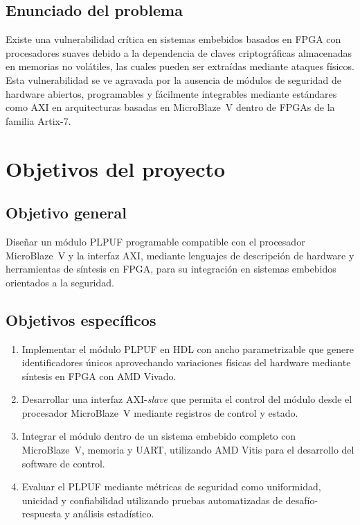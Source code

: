 \subsection{Enunciado del problema}

Existe una vulnerabilidad crítica en sistemas embebidos basados en FPGA con procesadores
suaves debido a la dependencia de claves criptográficas almacenadas en memorias no
volátiles, las cuales pueden ser extraídas mediante ataques físicos. Esta vulnerabilidad
se ve agravada por la ausencia de módulos de seguridad de hardware abiertos,
programables y fácilmente integrables mediante estándares como AXI en arquitecturas
basadas en MicroBlaze~V dentro de FPGAs de la familia Artix-7.


\section{Objetivos del proyecto}

\subsection{Objetivo general}

Diseñar un módulo PLPUF programable compatible con el procesador MicroBlaze~V y la
interfaz AXI, mediante lenguajes de descripción de hardware y herramientas de síntesis
en FPGA, para su integración en sistemas embebidos orientados a la seguridad.

\subsection{Objetivos específicos}

\begin{enumerate}
\item Implementar el módulo PLPUF en HDL con ancho parametrizable que genere
identificadores únicos aprovechando variaciones físicas del hardware mediante
síntesis en FPGA con AMD Vivado.

\item Desarrollar una interfaz AXI-\textit{slave} que permita el control del módulo
desde el procesador MicroBlaze~V mediante registros de control y estado.

\item Integrar el módulo dentro de un sistema embebido completo con MicroBlaze~V,
memoria y UART, utilizando AMD Vitis para el desarrollo del software de control.

\item Evaluar el PLPUF mediante métricas de seguridad como uniformidad, unicidad y
confiabilidad utilizando pruebas automatizadas de desafío-respuesta y análisis
estadístico.
\end{enumerate}

